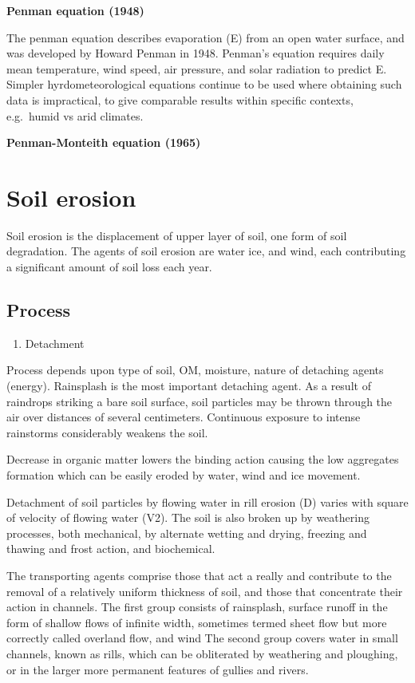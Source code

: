 \documentclass[
  openany]{book}
\providecommand{\tightlist}{%
  \setlength{\itemsep}{0pt}\setlength{\parskip}{0pt}}
\begin{document}
\textbf{Penman equation (1948)}

The penman equation describes evaporation (E) from an open water surface, and was developed by Howard Penman in 1948. Penman's equation requires daily mean temperature, wind speed, air pressure, and solar radiation to predict E. Simpler hyrdometeorological equations continue to be used where obtaining such data is impractical, to give comparable results within specific contexts, e.g.~humid vs arid climates.

\textbf{Penman-Monteith equation (1965)}

\hypertarget{soil-erosion}{%
\section{Soil erosion}\label{soil-erosion}}

Soil erosion is the displacement of upper layer of soil, one form of soil degradation. The agents of soil erosion are water ice, and wind, each contributing a significant amount of soil loss each year.

\hypertarget{process}{%
\subsection{Process}\label{process}}

\begin{enumerate}
\def\labelenumi{\arabic{enumi}.}
\tightlist
\item
  Detachment
\end{enumerate}

Process depends upon type of soil, OM, moisture, nature of detaching agents (energy). Rainsplash is the most important detaching agent. As a result of raindrops striking a bare soil surface, soil particles may be thrown through the air over distances of several centimeters. Continuous exposure to intense rainstorms considerably weakens the soil.

Decrease in organic matter lowers the binding action causing the low aggregates formation which can be easily eroded by water, wind and ice movement.

Detachment of soil particles by flowing water in rill erosion (D) varies with square of velocity of flowing water (V2). The soil is also broken up by weathering processes, both mechanical, by alternate wetting and drying, freezing and thawing and frost action, and biochemical.

The transporting agents comprise those that act a really and contribute to the removal of a relatively uniform thickness of soil, and those that concentrate their action in channels. The first group consists of rainsplash, surface runoff in the form of shallow flows of infinite width, sometimes termed sheet flow but more correctly called overland flow, and wind The second group covers water in small channels, known as rills, which can be obliterated by weathering and ploughing, or in the larger more permanent features of gullies and rivers.
\end{document}
